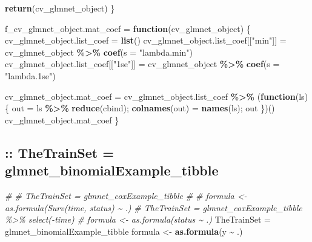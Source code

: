 \documentclass[
]{article}
\newenvironment{Shaded}{\begin{snugshade}}{\end{snugshade}}
\newcommand{\AttributeTok}[1]{\textcolor[rgb]{0.13,0.29,0.53}{#1}}
\newcommand{\CommentTok}[1]{\textcolor[rgb]{0.56,0.35,0.01}{\textit{#1}}}
\newcommand{\ControlFlowTok}[1]{\textcolor[rgb]{0.13,0.29,0.53}{\textbf{#1}}}
\newcommand{\FunctionTok}[1]{\textcolor[rgb]{0.13,0.29,0.53}{\textbf{#1}}}
\newcommand{\NormalTok}[1]{#1}
\newcommand{\OtherTok}[1]{\textcolor[rgb]{0.56,0.35,0.01}{#1}}
\newcommand{\SpecialCharTok}[1]{\textcolor[rgb]{0.81,0.36,0.00}{\textbf{#1}}}
\newcommand{\StringTok}[1]{\textcolor[rgb]{0.31,0.60,0.02}{#1}}
\begin{document}
\begin{Shaded}
\begin{Highlighting}[]
    \FunctionTok{return}\NormalTok{(cv\_glmnet\_object)}
\NormalTok{\}}

\NormalTok{f\_cv\_glmnet\_object.mat\_coef }\OtherTok{=} \ControlFlowTok{function}\NormalTok{(cv\_glmnet\_object) \{}
\NormalTok{    cv\_glmnet\_object.list\_coef }\OtherTok{=} \FunctionTok{list}\NormalTok{()}
\NormalTok{    cv\_glmnet\_object.list\_coef[[}\StringTok{"min"}\NormalTok{]] }\OtherTok{=}\NormalTok{ cv\_glmnet\_object }\SpecialCharTok{\%\textgreater{}\%} \FunctionTok{coef}\NormalTok{(}\AttributeTok{s =} \StringTok{"lambda.min"}\NormalTok{)}
\NormalTok{    cv\_glmnet\_object.list\_coef[[}\StringTok{"1se"}\NormalTok{]] }\OtherTok{=}\NormalTok{ cv\_glmnet\_object }\SpecialCharTok{\%\textgreater{}\%} \FunctionTok{coef}\NormalTok{(}\AttributeTok{s =} \StringTok{"lambda.1se"}\NormalTok{)}

\NormalTok{    cv\_glmnet\_object.mat\_coef }\OtherTok{=}\NormalTok{ cv\_glmnet\_object.list\_coef }\SpecialCharTok{\%\textgreater{}\%}\NormalTok{ (}\ControlFlowTok{function}\NormalTok{(ls) \{}
\NormalTok{        out }\OtherTok{=}\NormalTok{ ls }\SpecialCharTok{\%\textgreater{}\%} \FunctionTok{reduce}\NormalTok{(cbind); }
        \FunctionTok{colnames}\NormalTok{(out) }\OtherTok{=} \FunctionTok{names}\NormalTok{(ls); }
\NormalTok{        out}
\NormalTok{    \})()}
\NormalTok{    cv\_glmnet\_object.mat\_coef}
\NormalTok{\}}
\end{Highlighting}
\end{Shaded}

\hypertarget{thetrainset-glmnet_binomialexample_tibble}{%
\subsection{:: TheTrainSet =
glmnet\_binomialExample\_tibble}\label{thetrainset-glmnet_binomialexample_tibble}}

\begin{Shaded}
\begin{Highlighting}[]
\CommentTok{\# \# TheTrainSet = glmnet\_coxExample\_tibble}
\CommentTok{\# \# formula \textless{}{-} as.formula(Surv(time, status) \textasciitilde{} .)}
\CommentTok{\# TheTrainSet = glmnet\_coxExample\_tibble \%\textgreater{}\% select({-}time)}
\CommentTok{\# formula \textless{}{-} as.formula(status \textasciitilde{} .)}
\NormalTok{TheTrainSet }\OtherTok{=}\NormalTok{ glmnet\_binomialExample\_tibble}
\NormalTok{formula }\OtherTok{\textless{}{-}} \FunctionTok{as.formula}\NormalTok{(y }\SpecialCharTok{\textasciitilde{}}\NormalTok{ .)}
\end{Highlighting}
\end{Shaded}
\end{document}
